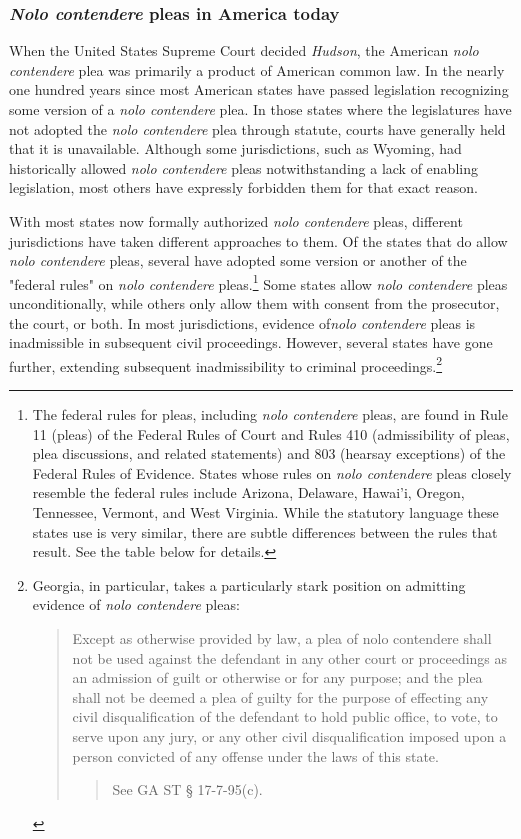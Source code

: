 \subsubsection{\textit{Nolo contendere} pleas in America today}

When the United States Supreme Court decided \textit{Hudson}, the American \textit{nolo contendere} plea was primarily a product of American common law. In the nearly one hundred years since most American states have passed legislation recognizing some version of a \textit{nolo contendere} plea. In those states where the legislatures have not adopted the \textit{nolo contendere} plea through statute, courts have generally held that it is unavailable. Although some jurisdictions, such as Wyoming, had historically allowed \textit{nolo contendere} pleas notwithstanding a lack of enabling legislation, most others have expressly forbidden them for that exact reason. 

With most states now formally authorized \textit{nolo contendere} pleas, different jurisdictions have taken different approaches to them. Of the states that do allow \textit{nolo contendere} pleas, several have adopted some version or another of the "federal rules" on \textit{nolo contendere} pleas.\footnote{The federal rules for pleas, including \textit{nolo contendere} pleas, are found in Rule 11 (pleas) of the Federal Rules of Court and Rules 410 (admissibility of pleas, plea discussions, and related statements) and 803 (hearsay exceptions) of the Federal Rules of Evidence. States whose rules on \textit{nolo contendere} pleas closely resemble the federal rules include Arizona, Delaware, Hawai'i, Oregon, Tennessee, Vermont, and West Virginia. While the statutory language these states use is very similar, there are subtle differences between the rules that result. See the table below for details.} Some states allow \textit{nolo contendere} pleas unconditionally, while others only allow them with consent from the prosecutor, the court, or both. In most jurisdictions, evidence of\textit{nolo contendere} pleas is inadmissible in subsequent civil proceedings. However, several states have gone further, extending subsequent inadmissibility to criminal proceedings.\footnote{Georgia, in particular, takes a particularly stark position on admitting evidence of \textit{nolo contendere} pleas:

\begin{quote}
    Except as otherwise provided by law, a plea of nolo contendere shall not be used against the defendant in any other court or proceedings as an admission of guilt or otherwise or for any purpose; and the plea shall not be deemed a plea of guilty for the purpose of effecting any civil disqualification of the defendant to hold public office, to vote, to serve upon any jury, or any other civil disqualification imposed upon a person convicted of any offense under the laws of this state.
    
    \begin{quote}
        See GA ST § 17-7-95(c).
    \end{quote}
    
\end{quote}}

